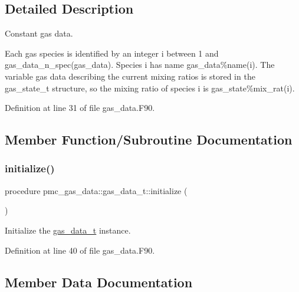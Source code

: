 \subsection{Detailed Description}
Constant gas data. 

Each gas species is identified by an integer {\ttfamily i} between 1 and {\ttfamily gas\+\_\+data\+\_\+n\+\_\+spec(gas\+\_\+data)}. Species {\ttfamily i} has name {\ttfamily gas\+\_\+data\%name}(i). The variable gas data describing the current mixing ratios is stored in the gas\+\_\+state\+\_\+t structure, so the mixing ratio of species {\ttfamily i} is gas\+\_\+state\%mix\+\_\+rat(i). 

Definition at line 31 of file gas\+\_\+data.\+F90.



\subsection{Member Function/\+Subroutine Documentation}
\mbox{\label{structpmc__gas__data_1_1gas__data__t_ab2516df3d61303f31721437a49f3e844}} 
\subsubsection{\texorpdfstring{initialize()}{initialize()}}
{\footnotesize\ttfamily procedure pmc\+\_\+gas\+\_\+data\+::gas\+\_\+data\+\_\+t\+::initialize (\begin{DoxyParamCaption}{ }\end{DoxyParamCaption})}



Initialize the \mbox{\hyperlink{structpmc__gas__data_1_1gas__data__t}{gas\+\_\+data\+\_\+t}} instance. 



Definition at line 40 of file gas\+\_\+data.\+F90.



\subsection{Member Data Documentation}
\mbox{\label{structpmc__gas__data_1_1gas__data__t_a966d877df13fc1f0bc63e9c8b66dd2f5}} 
